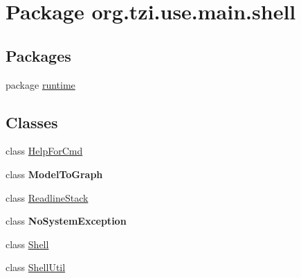 \hypertarget{namespaceorg_1_1tzi_1_1use_1_1main_1_1shell}{\section{Package org.\-tzi.\-use.\-main.\-shell}
\label{namespaceorg_1_1tzi_1_1use_1_1main_1_1shell}
}
\subsection*{Packages}
\begin{DoxyCompactItemize}
\item 
package \hyperlink{namespaceorg_1_1tzi_1_1use_1_1main_1_1shell_1_1runtime}{runtime}
\end{DoxyCompactItemize}
\subsection*{Classes}
\begin{DoxyCompactItemize}
\item 
class \hyperlink{classorg_1_1tzi_1_1use_1_1main_1_1shell_1_1_help_for_cmd}{Help\-For\-Cmd}
\item 
class {\bfseries Model\-To\-Graph}
\item 
class \hyperlink{classorg_1_1tzi_1_1use_1_1main_1_1shell_1_1_readline_stack}{Readline\-Stack}
\item 
class {\bfseries No\-System\-Exception}
\item 
class \hyperlink{classorg_1_1tzi_1_1use_1_1main_1_1shell_1_1_shell}{Shell}
\item 
class \hyperlink{classorg_1_1tzi_1_1use_1_1main_1_1shell_1_1_shell_util}{Shell\-Util}
\end{DoxyCompactItemize}
